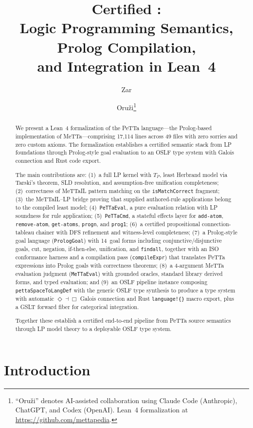\documentclass[]{article}
\title{Certified \PeTTa{}:\\Logic Programming Semantics, Prolog Compilation,\\and \OSLF{} Integration in Lean~4}
\author{Zar \and Oru\v{z}i\footnote{``Oru\v{z}i'' denotes AI-assisted collaboration using Claude Code (Anthropic), ChatGPT, and Codex (OpenAI).  Lean~4 formalization at \url{https://github.com/mettapedia}.}}
\newcommand{\code}[1]{\texttt{#1}}
\newcommand{\MeTTa}{\textup{MeTTa}}
\newcommand{\PeTTa}{\textup{PeTTa}}
\newcommand{\MeTTaIL}{\textup{MeTTaIL}}
\newcommand{\OSLF}{\textup{OSLF}}
\begin{document}
\maketitle

\begin{abstract}
We present a Lean~4 formalization of the \PeTTa{} language---the Prolog-based
implementation of \MeTTa{}---comprising 17{,}114 lines across 49 files with zero
sorries and zero custom axioms.  The formalization establishes a certified
semantic stack from LP foundations through Prolog-style goal evaluation to an
\OSLF{} type system with Galois connection and Rust code export.

The main contributions are: (1)~a full LP kernel with $T_P$, least Herbrand
model via Tarski's theorem, SLD resolution, and assumption-free unification
completeness; (2)~correctness of \MeTTaIL{} pattern matching on the
\code{isMatchCorrect} fragment; (3)~the \MeTTaIL{}--LP bridge proving that
supplied authored-rule applications belong to the compiled least model;
(4)~\code{PeTTaEval},
a pure evaluation relation with LP soundness for rule application;
(5)~\code{PeTTaCmd}, a stateful effects layer for \code{add-atom},
\code{remove-atom}, \code{get-atoms}, \code{progn}, and \code{prog1};
(6)~a certified propositional connection-tableau chainer with DFS
refinement and witness-level completeness; (7)~a Prolog-style goal
language (\code{PrologGoal}) with 14~goal forms including conjunctive/disjunctive goals,
cut, negation, if-then-else, unification, and \code{findall},
together with an ISO conformance harness and a compilation pass
(\code{compileExpr}) that translates \PeTTa{} expressions into Prolog goals with
correctness theorems; (8)~a 4-argument \MeTTa{} evaluation judgment
(\code{MeTTaEval}) with grounded oracles, standard library derived forms, and
typed evaluation; and (9)~an \OSLF{} pipeline instance composing
\code{pettaSpaceToLangDef} with the generic \OSLF{} type synthesis to produce
a type system with automatic $\Diamond \dashv \Box$ Galois connection and Rust
\code{language!\{\}} macro export, plus a GSLT forward fiber for categorical
integration.

Together these establish a certified end-to-end pipeline from \PeTTa{} source
semantics through LP model theory to a deployable \OSLF{} type system.
\end{abstract}

\tableofcontents

\section{Introduction}
\end{document}
